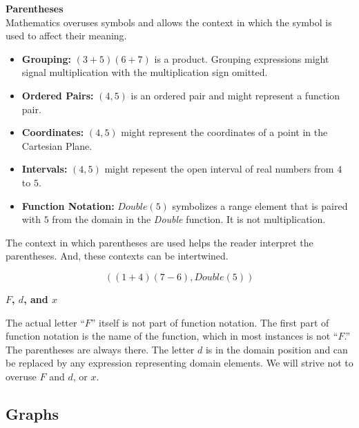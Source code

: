 \documentclass{ximera}
\begin{document}
\begin{notation}  \textbf{\textcolor{blue!55!black}{Parentheses}}  \\

Mathematics overuses symbols and allows the context in which the symbol is used to affect their meaning.
	\begin{itemize}
		\item \textbf{Grouping:} $(3+5)(6+7)$ is a product.  Grouping expressions might signal multiplication with the multiplication sign omitted.
		\item \textbf{Ordered Pairs:} $(4, 5)$ is an ordered pair and might represent a function pair.
		\item \textbf{Coordinates:} $(4, 5)$ might represent the coordinates of a point in the Cartesian Plane.
		\item \textbf{Intervals:} $(4, 5)$ might repesent the open interval of real numbers from $4$ to $5$.
		\item \textbf{Function Notation:} $Double(5)$ symbolizes a range element that is paired with $5$ from the domain in the \textit{Double} function. It is not multiplication.
	\end{itemize}


The context in which parentheses are used helps the reader interpret the parentheses.  And, these contexts can be intertwined.

\[  ((1+4)(7-6), Double(5))    \]
\end{notation}




\begin{warning} \textbf{\textcolor{red!70!black}{$F$, $d$, and $x$}}  

The actual letter ``$F$'' itself is not part of function notation.  The first part of function notation is the name of the function, which in most instances is not ``$F$.'' The parentheses are always there.  The letter $d$ is in the domain position and can be replaced by any expression representing domain elements.  We will strive not to overuse $F$ and $d$, or $x$.
\end{warning}









\subsection*{Graphs}
\end{document}
